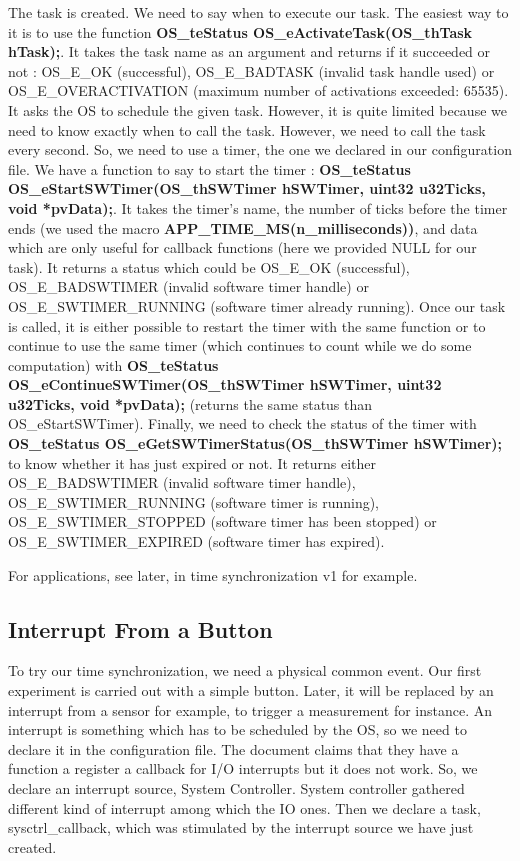 The task is created. We need to say when to execute our task. The easiest way to it is to use the function \textbf{OS\_teStatus OS\_eActivateTask(OS\_thTask hTask);}. It takes the task name as an argument and returns if it succeeded or not : OS\_E\_OK (successful), OS\_E\_BADTASK (invalid task handle used) or OS\_E\_OVERACTIVATION (maximum number of activations exceeded: 65535). It asks the OS to schedule the given task. However, it is quite limited because we need to know exactly when to call the task. However, we need to call the task every second. So, we need to use a timer, the one we declared in our configuration file. We have a function to say to start the timer : \textbf{OS\_teStatus OS\_eStartSWTimer(OS\_thSWTimer hSWTimer, uint32 u32Ticks, void *pvData);}. It takes the timer's name, the number of ticks before the timer ends (we used the macro \textbf{APP\_TIME\_MS(n\_milliseconds))}, and data which are only useful for callback functions (here we provided NULL for our task). It returns a status which could be OS\_E\_OK (successful), OS\_E\_BADSWTIMER (invalid software timer handle) or OS\_E\_SWTIMER\_RUNNING (software timer already running). Once our task is called, it is either possible to restart the timer with the same function or to continue to use the same timer (which continues to count while we do some computation) with \textbf{OS\_teStatus OS\_eContinueSWTimer(OS\_thSWTimer hSWTimer, uint32 u32Ticks, void *pvData);} (returns the same status than OS\_eStartSWTimer). Finally, we need to check the status of the timer with \textbf{OS\_teStatus OS\_eGetSWTimerStatus(OS\_thSWTimer hSWTimer);} to know whether it has just expired or not. It returns either OS\_E\_BADSWTIMER (invalid software timer handle), OS\_E\_SWTIMER\_RUNNING (software timer is running), OS\_E\_SWTIMER\_STOPPED (software timer has been stopped) or OS\_E\_SWTIMER\_EXPIRED (software timer has expired).

For applications, see later, in time synchronization v1 for example.

\subsection{Interrupt From a Button}

To try our time synchronization, we need a physical common event. Our first experiment is carried out with a simple button. Later, it will be replaced by an interrupt from a sensor for example, to trigger a measurement for instance. An interrupt is something which has to be scheduled by the OS, so we need to declare it in the configuration file. The document claims that they have a function a register a callback for I/O interrupts but it does not work. So, we declare an interrupt source, System Controller. System controller gathered different kind of interrupt among which the IO ones. Then we declare a task, sysctrl\_callback, which was stimulated by the interrupt source we have just created.

